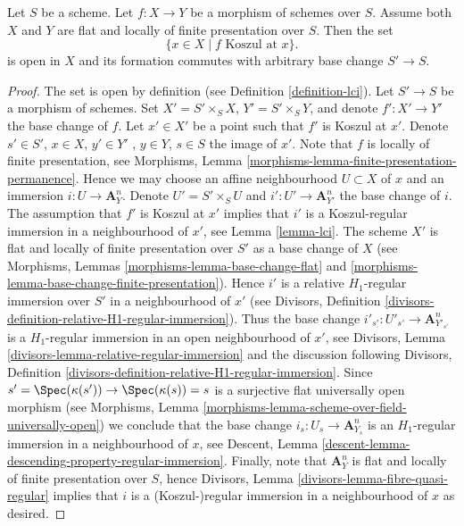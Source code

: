 \begin{lemma}
\label{lemma-base-change-lci-fibres}
Let $S$ be a scheme. Let $f : X \to Y$ be a morphism of schemes over $S$.
Assume both $X$ and $Y$ are flat and locally of finite presentation over $S$.
Then the set
$$
\{x \in X \mid f\text{ Koszul at }x\}.
$$
is open in $X$ and its formation commutes with arbitrary base change
$S' \to S$.
\end{lemma}

\begin{proof}
The set is open by definition (see
Definition \ref{definition-lci}).
Let $S' \to S$ be a morphism of schemes. Set $X' = S' \times_S X$,
$Y' = S' \times_S Y$, and denote $f' : X' \to Y'$ the base change of $f$.
Let $x' \in X'$ be a point such that $f'$ is Koszul at $x'$. Denote
$s' \in S'$, $x \in X$, $y' \in Y'$ , $y \in Y$, $s \in S$ the image
of $x'$. Note that $f$ is locally of finite presentation, see
Morphisms, Lemma \ref{morphisms-lemma-finite-presentation-permanence}.
Hence we may choose an affine neighbourhood $U \subset X$ of
$x$ and an immersion $i : U \to \mathbf{A}^n_Y$. Denote $U' = S' \times_S U$
and $i' : U' \to \mathbf{A}^n_{Y'}$ the base change of $i$.
The assumption that $f'$ is Koszul at $x'$ implies that $i'$ is a
Koszul-regular immersion in a neighbourhood of $x'$, see
Lemma \ref{lemma-lci}.
The scheme $X'$ is flat and locally of finite
presentation over $S'$ as a base change of $X$ (see
Morphisms, Lemmas \ref{morphisms-lemma-base-change-flat} and
\ref{morphisms-lemma-base-change-finite-presentation}).
Hence $i'$ is a relative $H_1$-regular immersion over $S'$
in a neighbourhood of $x'$ (see
Divisors, Definition \ref{divisors-definition-relative-H1-regular-immersion}).
Thus the base change $i'_{s'} : U'_{s'} \to \mathbf{A}^n_{Y'_{s'}}$ is
a $H_1$-regular immersion in an open neighbourhood of $x'$, see
Divisors, Lemma \ref{divisors-lemma-relative-regular-immersion}
and the discussion following
Divisors, Definition \ref{divisors-definition-relative-H1-regular-immersion}.
Since $s' = \Spec(\kappa(s')) \to \Spec(\kappa(s)) = s$
is a surjective flat universally open morphism (see
Morphisms, Lemma \ref{morphisms-lemma-scheme-over-field-universally-open})
we conclude that the base change $i_s : U_s \to \mathbf{A}^n_{Y_s}$ is an
$H_1$-regular immersion in a neighbourhood of $x$, see
Descent, Lemma \ref{descent-lemma-descending-property-regular-immersion}.
Finally, note that $\mathbf{A}^n_Y$ is flat and locally of finite
presentation over $S$, hence
Divisors, Lemma \ref{divisors-lemma-fibre-quasi-regular}
implies that $i$ is a (Koszul-)regular immersion in a neighbourhood of $x$
as desired.
\end{proof}

